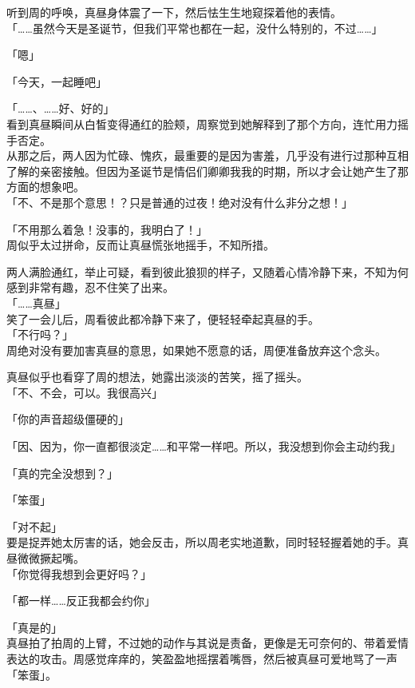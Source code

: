 听到周的呼唤，真昼身体震了一下，然后怯生生地窥探着他的表情。\\

「……虽然今天是圣诞节，但我们平常也都在一起，没什么特别的，不过……」

「嗯」

「今天，一起睡吧」

「……、……好、好的」\\

看到真昼瞬间从白皙变得通红的脸颊，周察觉到她解释到了那个方向，连忙用力摇手否定。\\

从那之后，两人因为忙碌、愧疚，最重要的是因为害羞，几乎没有进行过那种互相了解的亲密接触。但因为圣诞节是情侣们卿卿我我的时期，所以才会让她产生了那方面的想象吧。\\

「不、不是那个意思！？只是普通的过夜！绝对没有什么非分之想！」

「不用那么着急！没事的，我明白了！」\\

周似乎太过拼命，反而让真昼慌张地摇手，不知所措。

两人满脸通红，举止可疑，看到彼此狼狈的样子，又随着心情冷静下来，不知为何感到非常有趣，忍不住笑了出来。\\

「……真昼」\\

笑了一会儿后，周看彼此都冷静下来了，便轻轻牵起真昼的手。\\

「不行吗？」\\

周绝对没有要加害真昼的意思，如果她不愿意的话，周便准备放弃这个念头。

真昼似乎也看穿了周的想法，她露出淡淡的苦笑，摇了摇头。\\

「不、不会，可以。我很高兴」

「你的声音超级僵硬的」

「因、因为，你一直都很淡定……和平常一样吧。所以，我没想到你会主动约我」

「真的完全没想到？」

「笨蛋」

「对不起」\\

要是捉弄她太厉害的话，她会反击，所以周老实地道歉，同时轻轻握着她的手。真昼微微撅起嘴。\\

「你觉得我想到会更好吗？」

「都一样……反正我都会约你」

「真是的」\\

真昼拍了拍周的上臂，不过她的动作与其说是责备，更像是无可奈何的、带着爱情表达的攻击。周感觉痒痒的，笑盈盈地摇摆着嘴唇，然后被真昼可爱地骂了一声「笨蛋」。\\

